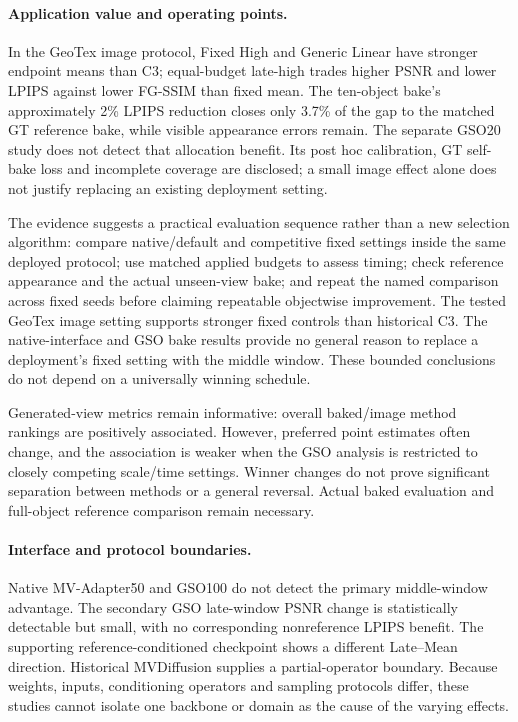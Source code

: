 \documentclass[times,twocolumn,final]{elsarticle}
\begin{document}
\paragraph{Application value and operating points.}
In the GeoTex image protocol, Fixed High and Generic Linear have stronger endpoint means than C3; equal-budget late-high trades higher PSNR and lower LPIPS against lower FG-SSIM than fixed mean. The ten-object bake's approximately 2\% LPIPS reduction closes only 3.7\% of the gap to the matched GT reference bake, while visible appearance errors remain. The separate GSO20 study does not detect that allocation benefit. Its post hoc calibration, GT self-bake loss and incomplete coverage are disclosed; a small image effect alone does not justify replacing an existing deployment setting.

The evidence suggests a practical evaluation sequence rather than a new selection algorithm: compare native/default and competitive fixed settings inside the same deployed protocol; use matched applied budgets to assess timing; check reference appearance and the actual unseen-view bake; and repeat the named comparison across fixed seeds before claiming repeatable objectwise improvement. The tested GeoTex image setting supports stronger fixed controls than historical C3. The native-interface and GSO bake results provide no general reason to replace a deployment's fixed setting with the middle window. These bounded conclusions do not depend on a universally winning schedule.

Generated-view metrics remain informative: overall baked/image method rankings are positively associated. However, preferred point estimates often change, and the association is weaker when the GSO analysis is restricted to closely competing scale/time settings. Winner changes do not prove significant separation between methods or a general reversal. Actual baked evaluation and full-object reference comparison remain necessary.

\paragraph{Interface and protocol boundaries.}
Native MV-Adapter50 and GSO100 do not detect the primary middle-window advantage. The secondary GSO late-window PSNR change is statistically detectable but small, with no corresponding nonreference LPIPS benefit. The supporting reference-conditioned checkpoint shows a different Late--Mean direction. Historical MVDiffusion supplies a partial-operator boundary. Because weights, inputs, conditioning operators and sampling protocols differ, these studies cannot isolate one backbone or domain as the cause of the varying effects.
\end{document}

